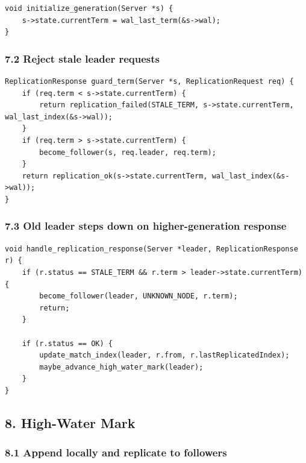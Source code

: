 \documentclass[10pt,letterpaper]{article}
\begin{document}
\begin{verbatim}
void initialize_generation(Server *s) {
    s->state.currentTerm = wal_last_term(&s->wal);
}
\end{verbatim}

\subsubsection*{7.2 Reject stale leader requests}

\begin{verbatim}
ReplicationResponse guard_term(Server *s, ReplicationRequest req) {
    if (req.term < s->state.currentTerm) {
        return replication_failed(STALE_TERM, s->state.currentTerm, wal_last_index(&s->wal));
    }
    if (req.term > s->state.currentTerm) {
        become_follower(s, req.leader, req.term);
    }
    return replication_ok(s->state.currentTerm, wal_last_index(&s->wal));
}
\end{verbatim}

\subsubsection*{7.3 Old leader steps down on higher-generation response}

\begin{verbatim}
void handle_replication_response(Server *leader, ReplicationResponse r) {
    if (r.status == STALE_TERM && r.term > leader->state.currentTerm) {
        become_follower(leader, UNKNOWN_NODE, r.term);
        return;
    }

    if (r.status == OK) {
        update_match_index(leader, r.from, r.lastReplicatedIndex);
        maybe_advance_high_water_mark(leader);
    }
}
\end{verbatim}

\subsection*{8. High-Water Mark}

\subsubsection*{8.1 Append locally and replicate to followers}
\end{document}
